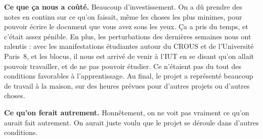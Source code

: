 \documentclass[11pt,a4paper]{article}
\begin{document}
\textbf{Ce que ça nous a coûté.} Beaucoup d'investissement. On a dû prendre des notes en continu sur ce qu'on faisait, même les choses les plus minimes, pour pouvoir écrire le document que vous avez sous les yeux. Ça a pris du temps, et c'était assez pénible. En plus, les perturbations des dernières semaines nous ont ralentis : avec les manifestations étudiantes autour du CROUS et de l'Université Paris~8, et les blocus, il nous est arrivé de venir à l'IUT en se disant qu'on allait pouvoir travailler, et de ne pas pouvoir étudier. Ce n'étaient pas du tout des conditions favorables à l'apprentissage. Au final, le projet a représenté beaucoup de travail à la maison, sur des heures prévues pour d'autres projets ou d'autres choses.

\textbf{Ce qu'on ferait autrement.} Honnêtement, on ne voit pas vraiment ce qu'on aurait fait autrement. On aurait juste voulu que le projet se déroule dans d'autres conditions.
\end{document}
